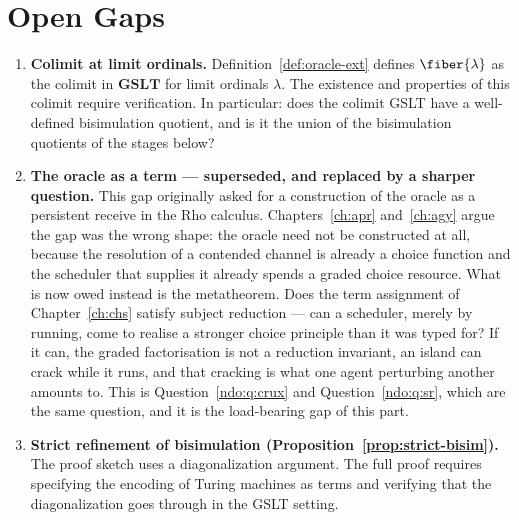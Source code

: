 \chapter{Open Gaps}
\label{sec:gaps}

\begin{enumerate}[label=\textbf{Gap \arabic*.}, leftmargin=*, itemsep=8pt]

  \item \textbf{Colimit at limit ordinals.}
        Definition~\ref{def:oracle-ext} defines $\fiber{\lambda}$
        as the colimit in $\mathbf{GSLT}$ for limit ordinals
        $\lambda$.
        The existence and properties of this colimit require
        verification.
        In particular: does the colimit GSLT have a well-defined
        bisimulation quotient, and is it the union of the bisimulation
        quotients of the stages below?

  \item \textbf{The oracle as a term --- superseded, and replaced
        by a sharper question.}
        This gap originally asked for a construction of the oracle
        as a persistent receive in the Rho calculus.
        Chapters~\ref{ch:apr} and~\ref{ch:agy} argue the gap was
        the wrong shape: the oracle need not be constructed at all,
        because the resolution of a contended channel is already a
        choice function and the scheduler that supplies it already
        spends a graded choice resource.
        What is now owed instead is the metatheorem.
        Does the term assignment of Chapter~\ref{ch:chs} satisfy
        subject reduction --- can a scheduler, merely by running,
        come to realise a stronger choice principle than it was
        typed for?
        If it can, the graded factorisation is not a reduction
        invariant, an island can crack while it runs, and that
        cracking is what one agent perturbing another amounts to.
        This is Question~\ref{ndo:q:crux} and
        Question~\ref{ndo:q:sr}, which are the same question, and
        it is the load-bearing gap of this part.

  \item \textbf{Strict refinement of bisimulation
        (Proposition~\ref{prop:strict-bisim}).}
        The proof sketch uses a diagonalization argument.
        The full proof requires specifying the encoding of Turing
        machines as terms and verifying that the diagonalization
        goes through in the GSLT setting.


\end{enumerate}
